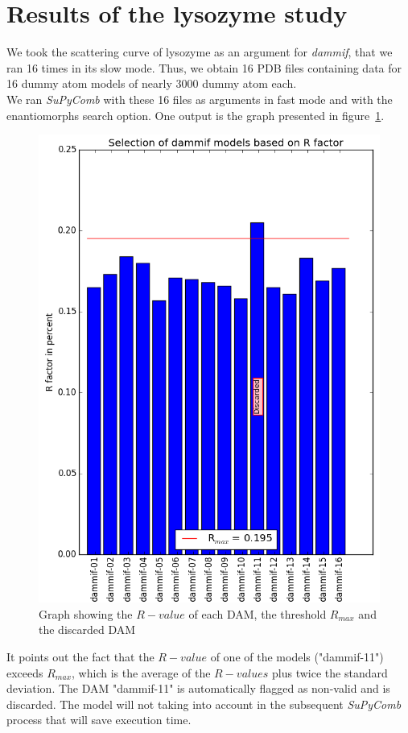 \documentclass[a4paper, 11pt]{report}
\begin{document}
\section{Results of the lysozyme study}%

We took the scattering curve of lysozyme as an argument for 
\textit{dammif}, that we ran 16 times in its slow mode. 
Thus, we obtain 16 PDB files containing data for 16 dummy atom models 
of nearly 3000 dummy atom each.\\

We ran \textit{SuPyComb} with these 16 files as arguments in fast mode 
and with the enantiomorphs search option. 
One output is the graph presented in figure~\ref{fgr:rfactor}. 
\begin{figure}
\centering
\includegraphics[scale=0.6]{Rfactor.png}
\caption{Graph showing the $R-value$ of each DAM, the threshold $R_{max}$ 
         and the discarded DAM}
\label{fgr:rfactor}
\end{figure}
It points out the fact that the $R-value$ of one of the models 
("dammif-11") exceeds $R_{max}$, which is the average of the 
$R-values$ plus twice the standard deviation. 
The DAM "dammif-11" is automatically flagged as non-valid and is 
discarded. 
The model will not taking into account in the subsequent 
\textit{SuPyComb} process that will save execution time.
\end{document}
